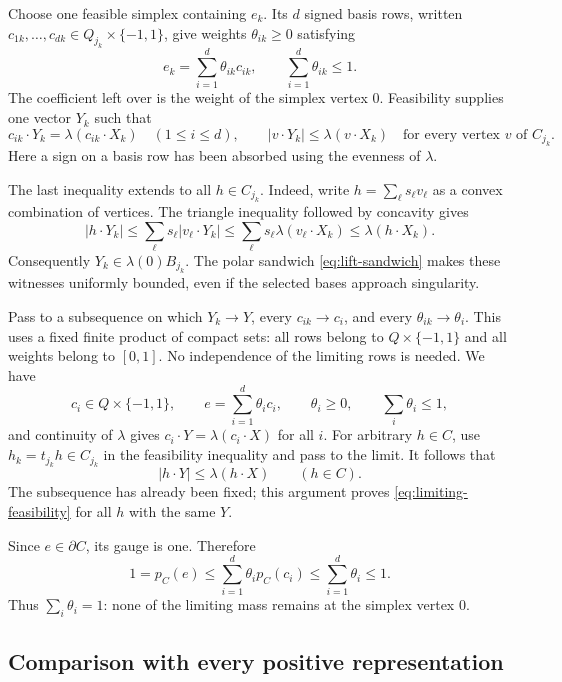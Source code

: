 Choose one feasible simplex containing $e_k$. Its $d$ signed basis rows, written $c_{1k},\ldots,c_{dk}\in Q_{j_k}\times\{-1,1\}$, give weights $\theta_{ik}\ge0$ satisfying
\begin{equation}\label{eq:approximate-representation}
 e_k=\sum_{i=1}^d\theta_{ik}c_{ik},
 \qquad \sum_{i=1}^d\theta_{ik}\le1.
\end{equation}
The coefficient left over is the weight of the simplex vertex $0$. Feasibility supplies one vector $Y_k$ such that
\[
 c_{ik}\cdot Y_k=\lambda(c_{ik}\cdot X_k)\quad(1\le i\le d),
 \qquad
 |v\cdot Y_k|\le\lambda(v\cdot X_k)
 \quad\text{for every vertex $v$ of $C_{j_k}$}.
\]
Here a sign on a basis row has been absorbed using the evenness of $\lambda$.

The last inequality extends to all $h\in C_{j_k}$. Indeed, write $h=\sum_\ell s_\ell v_\ell$ as a convex combination of vertices. The triangle inequality followed by concavity gives
\[
 |h\cdot Y_k|
 \le\sum_\ell s_\ell|v_\ell\cdot Y_k|
 \le\sum_\ell s_\ell\lambda(v_\ell\cdot X_k)
 \le\lambda(h\cdot X_k).
\]
Consequently $Y_k\in\lambda(0)B_{j_k}$. The polar sandwich \eqref{eq:lift-sandwich} makes these witnesses uniformly bounded, even if the selected bases approach singularity.

Pass to a subsequence on which $Y_k\to Y$, every $c_{ik}\to c_i$, and every $\theta_{ik}\to\theta_i$. This uses a fixed finite product of compact sets: all rows belong to $Q\times\{-1,1\}$ and all weights belong to $[0,1]$. No independence of the limiting rows is needed. We have
\[
 c_i\in Q\times\{-1,1\},\qquad
 e=\sum_{i=1}^d\theta_i c_i,\qquad
 \theta_i\ge0,\qquad \sum_i\theta_i\le1,
\]
and continuity of $\lambda$ gives $c_i\cdot Y=\lambda(c_i\cdot X)$ for all $i$. For arbitrary $h\in C$, use $h_k=t_{j_k}h\in C_{j_k}$ in the feasibility inequality and pass to the limit. It follows that
\begin{equation}\label{eq:limiting-feasibility}
 |h\cdot Y|\le\lambda(h\cdot X)\qquad(h\in C).
\end{equation}
The subsequence has already been fixed; this argument proves \eqref{eq:limiting-feasibility} for all $h$ with the same $Y$.

Since $e\in\partial C$, its gauge is one. Therefore
\[
 1=p_C(e)\le\sum_{i=1}^d\theta_i p_C(c_i)
   \le\sum_{i=1}^d\theta_i\le1.
\]
Thus $\sum_i\theta_i=1$: none of the limiting mass remains at the simplex vertex $0$.

\subsection{Comparison with every positive representation}

